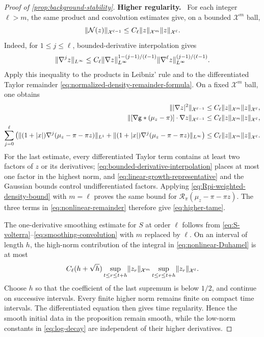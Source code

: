 \documentclass[11pt,reqno]{amsart}
\numberwithin{equation}{section}
\theoremstyle{plain}
\theoremstyle{remark}
\DeclarePairedDelimiter{\norm}{\lVert}{\rVert}
\newcommand{\parheading}[1]{\par\medskip\noindent\textbf{#1}\ }
\newcommand{\Xspace}{\mathcal X}
\begin{document}
\begin{proof}[Proof of \cref{prop:background-stability}]
\parheading{Higher regularity.}
For each integer $\ell>m$, the same product and convolution estimates give, on a bounded $\Xspace^m$ ball,
\begin{equation}\label{eq:higher-tame}
 \norm{\mathcal N(z)}_{\Xspace^{\ell-1}}
       \le C_\ell\norm z_{\Xspace^m}\norm z_{\Xspace^\ell}.
\end{equation}
Indeed, for $1\le j\le\ell$, bounded-derivative interpolation gives
\begin{equation}\label{eq:bounded-derivative-interpolation}
 \norm{\nabla^jz}_{L^\infty}
 \le C_\ell\norm{\nabla z}_{L^\infty}^{1-(j-1)/(\ell-1)}
             \norm{\nabla^\ell z}_{L^\infty}^{(j-1)/(\ell-1)}.
\end{equation}
Apply this inequality to the products in Leibniz' rule and to the differentiated Taylor remainder \eqref{eq:normalized-density-remainder-formula}. On a fixed $\Xspace^m$ ball, one obtains
\begin{align}
 \norm{|\nabla z|^2}_{\Xspace^{\ell-1}}
 &\le C_\ell\norm z_{\Xspace^m}\norm z_{\Xspace^\ell},\label{eq:tame-gradient-product}\\
 \norm{[\nabla\g*(\mu_z-\pi)]\cdot\nabla z}_{\Xspace^{\ell-1}}
 &\le C_\ell\norm z_{\Xspace^m}\norm z_{\Xspace^\ell},\label{eq:tame-nonlocal-product}\\
 \sum_{j=0}^\ell\left(\norm{(1+|x|)\nabla^j(\mu_z-\pi-\pi z)}_{L^1}
 +\norm{(1+|x|)\nabla^j(\mu_z-\pi-\pi z)}_{L^\infty}\right)
 &\le C_\ell\norm z_{\Xspace^m}\norm z_{\Xspace^\ell}.
 \label{eq:tame-density-remainder}
\end{align}
For the last estimate, every differentiated Taylor term contains at least two factors of $z$ or its derivatives; \eqref{eq:bounded-derivative-interpolation} places at most one factor in the highest norm, and \eqref{eq:linear-growth-representative} and the Gaussian bounds control undifferentiated factors. Applying \eqref{eq:Rpi-weighted-density-bound} with $m=\ell$ proves the same bound for $\mathcal R_\pi(\mu_z-\pi-\pi z)$. The three terms in \eqref{eq:nonlinear-remainder} therefore give \eqref{eq:higher-tame}.

The one-derivative smoothing estimate for $S$ at order $\ell$ follows from \eqref{eq:S-volterra}--\eqref{eq:smoothing-convolution} with $m$ replaced by $\ell$. On an interval of length $h$, the high-norm contribution of the integral in \eqref{eq:nonlinear-Duhamel} is at most
\begin{equation}\label{eq:high-norm-continuation}
 C_\ell(h+\sqrt h)
 \sup_{t\le r\le t+h}\norm{z_r}_{\Xspace^m}
 \sup_{t\le r\le t+h}\norm{z_r}_{\Xspace^\ell}.
\end{equation}
Choose $h$ so that the coefficient of the last supremum is below $1/2$, and continue on successive intervals. Every finite higher norm remains finite on compact time intervals. The differentiated equation then gives time regularity. Hence the smooth initial data in the proposition remain smooth, while the low-norm constants in \eqref{eq:log-decay} are independent of their higher derivatives.


\end{proof}
\end{document}
